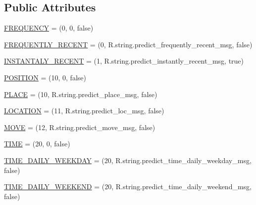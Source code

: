 \subsection*{\-Public \-Attributes}
\begin{DoxyCompactItemize}
\item 
\hyperlink{enumlab_1_1davidahn_1_1appshuttle_1_1predict_1_1matcher_1_1_matcher_type_a960bc779a4109ee29ab18c48b05b2edc}{\-F\-R\-E\-Q\-U\-E\-N\-C\-Y} = (0, 0, false)
\item 
\hyperlink{enumlab_1_1davidahn_1_1appshuttle_1_1predict_1_1matcher_1_1_matcher_type_abb51a22071be82f83efebfa7b11bdd15}{\-F\-R\-E\-Q\-U\-E\-N\-T\-L\-Y\-\_\-\-R\-E\-C\-E\-N\-T} = (0, \-R.\-string.\-predict\-\_\-frequently\-\_\-recent\-\_\-msg, false)
\item 
\hyperlink{enumlab_1_1davidahn_1_1appshuttle_1_1predict_1_1matcher_1_1_matcher_type_ad1fddb3b390415684ce1fe97214290f4}{\-I\-N\-S\-T\-A\-N\-T\-A\-L\-Y\-\_\-\-R\-E\-C\-E\-N\-T} = (1, \-R.\-string.\-predict\-\_\-instantly\-\_\-recent\-\_\-msg, true)
\item 
\hyperlink{enumlab_1_1davidahn_1_1appshuttle_1_1predict_1_1matcher_1_1_matcher_type_a0da09aa91a31723bfab566097178a7dc}{\-P\-O\-S\-I\-T\-I\-O\-N} = (10, 0, false)
\item 
\hyperlink{enumlab_1_1davidahn_1_1appshuttle_1_1predict_1_1matcher_1_1_matcher_type_ae03a3d63d560f64acad8fe9809fe23fd}{\-P\-L\-A\-C\-E} = (10, \-R.\-string.\-predict\-\_\-place\-\_\-msg, false)
\item 
\hyperlink{enumlab_1_1davidahn_1_1appshuttle_1_1predict_1_1matcher_1_1_matcher_type_a355ae999b0f912166a2c6ca7ed2a1c3a}{\-L\-O\-C\-A\-T\-I\-O\-N} = (11, \-R.\-string.\-predict\-\_\-loc\-\_\-msg, false)
\item 
\hyperlink{enumlab_1_1davidahn_1_1appshuttle_1_1predict_1_1matcher_1_1_matcher_type_ad115ad0881cdd77169cacf6be67dc41e}{\-M\-O\-V\-E} = (12, \-R.\-string.\-predict\-\_\-move\-\_\-msg, false)
\item 
\hyperlink{enumlab_1_1davidahn_1_1appshuttle_1_1predict_1_1matcher_1_1_matcher_type_a0b854b68f3a5f6eb7e4ccd87e8ecd411}{\-T\-I\-M\-E} = (20, 0, false)
\item 
\hyperlink{enumlab_1_1davidahn_1_1appshuttle_1_1predict_1_1matcher_1_1_matcher_type_abe492de70b987e519eb3d7f55cc59bcb}{\-T\-I\-M\-E\-\_\-\-D\-A\-I\-L\-Y\-\_\-\-W\-E\-E\-K\-D\-A\-Y} = (20, \-R.\-string.\-predict\-\_\-time\-\_\-daily\-\_\-weekday\-\_\-msg, false)
\item 
\hyperlink{enumlab_1_1davidahn_1_1appshuttle_1_1predict_1_1matcher_1_1_matcher_type_a1175c8bcb257cdd8195114f773d9f22e}{\-T\-I\-M\-E\-\_\-\-D\-A\-I\-L\-Y\-\_\-\-W\-E\-E\-K\-E\-N\-D} = (20, \-R.\-string.\-predict\-\_\-time\-\_\-daily\-\_\-weekend\-\_\-msg, false)

\end{DoxyCompactItemize}
